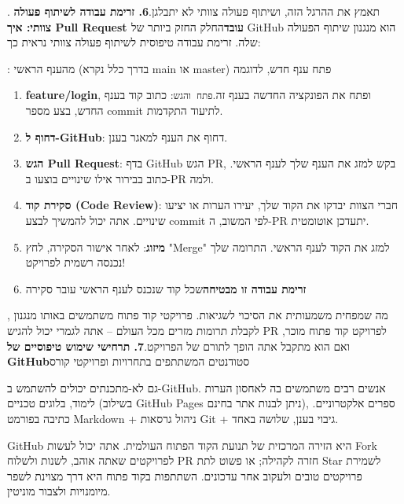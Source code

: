 . תאמץ את ההרגל הזה, ושיתוף פעולה צוותי לא יתבלגן.\textbf{6. זרימת עבודה לשיתוף פעולה צוותי: איך Pull Request עובד}החלק החזק ביותר של GitHub הוא מנגנון שיתוף הפעולה שלה. זרימת עבודה טיפוסית לשיתוף פעולה צוותי נראית כך:


: מהענף הראשי (בדרך כלל נקרא main או master) פתח ענף חדש, לדוגמה

\begin{enumerate}
  \item \textbf{feature/login}, ופתח את הפונקציה החדשה בענף זה.\texttt{פתח והגש}: כתוב קוד בענף החדש, בצע מספר commit לתיעוד התקדמות.
  \item \textbf{דחוף ל-GitHub}: דחוף את הענף למאגר בענן.
  \item \textbf{הגש Pull Request}: בדף GitHub הגש PR, בקש למזג את הענף שלך לענף הראשי. כתוב בבירור אילו שינויים בוצעו ב-PR ולמה.
  \item \textbf{סקירת קוד (Code Review)}: חברי הצוות יבדקו את הקוד שלך, יעירו הערות או יציעו שינויים. אתה יכול להמשיך לבצע commit לפי המשוב, ה-PR יתעדכן אוטומטית.
  \item \textbf{מיזוג}: לאחר אישור הסקירה, לחץ "Merge" למזג את הקוד לענף הראשי. התרומה שלך נכנסה רשמית לפרויקט!
  \item \textbf{זרימת עבודה זו מבטיחה}שכל קוד שנכנס לענף הראשי עובר סקירה
\end{enumerate}

, מה שמפחית משמעותית את הסיכוי לשגיאות. פרויקטי קוד פתוח משתמשים באותו מנגנון לקבלת תרומות מזרים מכל העולם – אתה לגמרי יכול להגיש PR לפרויקט קוד פתוח מוכר, ואם הוא מתקבל אתה הופך לתורם של הפרויקט.\textbf{7. תרחישי שימוש טיפוסיים של GitHub}סטודנטים המשתתפים בתחרויות ופרויקטי קורס



גם לא-מתכנתים יכולים להשתמש ב-GitHub. אנשים רבים משתמשים בה לאחסון הערות לימוד, בלוגים טכניים (בשילוב GitHub Pages ניתן לבנות אתר בחינם), ספרים אלקטרוניים. כתיבה בפורמט Markdown + ניהול גרסאות Git + גיבוי בענן, שלושה באחד.


GitHub היא הזירה המרכזית של תנועת הקוד הפתוח העולמית. אתה יכול לעשות Fork לפרויקטים שאתה אוהב, לשנות ולשלוח PR חזרה לקהילה; או פשוט לתת Star לשמירת פרויקטים טובים ולעקוב אחר עדכונים. השתתפות בקוד פתוח היא דרך מצוינת לשפר מיומנויות ולצבור מוניטין.

